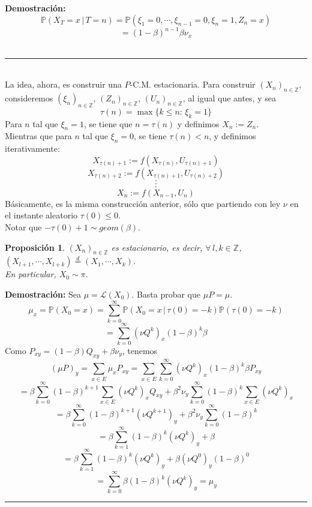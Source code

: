 \documentclass[a4paper]{article}
\newcommand{\prob}{\mathbb{P}}
\newtheorem{prop}{Proposici\'on}
\numberwithin{equation}{subsection}
\def\Z{\mathbb Z}
\begin{document}
\textbf{Demostración: }
\[\prob(X_T = x\,|\,T=n) = \prob(\xi_1 = 0,\cdots,\xi_{n-1}=0,\xi_n=1,Z_n=x)\]
\[ = (1-\beta)^{n-1}\beta \nu_x\]\\
\rule{0.7em}{0.7em}\\ \newline
La idea, ahora, es construir una $P$-C.M. estacionaria. Para construir $(X_n)_{n\in \Z}$, consideremos $(\xi_n)_{n\in \Z}$, $(Z_n)_{n\in \Z}$, $(U_n)_{n\in \Z}$, al igual que antes, y sea
\[\tau(n) = \max\{k\leq n:\,\xi_k=1\}\]
Para $n$ tal que  $\xi_n = 1$, se tiene que  $n=\tau(n)$ y definimos $X_n:=Z_n$.\\ Mientras que para $n$ tal que $\xi_n =0$, se tiene $\tau(n)<n$, y definimos iterativamente:
\[X_{\tau(n)+1}:= f(X_{\tau(n)},U_{\tau(n)+1})\]
\[X_{\tau(n)+2}:= f(X_{\tau(n)+1},U_{\tau(n)+2})\]
\[\cdot\]
\[\cdot\]
\[\cdot\]
\[X_n:= f(X_{n-1},U_n)\]
Básicamente, es la misma construcción  anterior, sólo que partiendo  con ley $\nu$ en el instante aleatorio $\tau(0)\leq 0$.\\ \newline
Notar que $-\tau(0)+1 \sim geom(\beta)$.
\begin{prop}
$(X_n)_{n\in \Z}$ es estacionario, es decir, $\forall\, l,k\in \Z$, $(X_{l+1},\cdots,X_{l+k}) \overset{\,d\,}{=}(X_1,\cdots,X_k)$.\\ En particular, $X_0\sim \pi$.
\end{prop}

\textbf{Demostración: }Sea $\mu = \mathcal{L}(X_0)$. Basta probar que $\mu P = \mu$.
\[\mu_x = \prob(X_0=x) = \sum_{k=0}^{\infty}\prob(X_0=x\,|\,\tau(0)=-k)\prob(\tau(0)=-k)\]
\[= \sum_{k=0}^{\infty}(\nu Q^k)_x (1-\beta)^{k}\beta\]
Como $P_{xy} = (1-\beta)Q_{xy} + \beta \nu_y$, tenemos
\[(\mu P)_y = \sum_{x\in E}\mu_x P_{xy} = \sum_{x\in E}\sum_{k=0}^{\infty}(\nu Q^k)_x(1-\beta)^k\beta P_{xy}\]
\[= \beta \sum_{k=0}^{\infty}(1-\beta)^{k+1}\sum_{x\in E}(\nu Q^k)_xQ_{xy} + \beta^2 \nu_y \sum_{k=0}^{\infty}(1-\beta)^k\sum_{x\in E}(\nu Q^k)_x\]
\[= \beta\sum_{k=0}^{\infty}(1-\beta)^{k+1}(\nu Q^{k+1})_y + \beta^2\nu_y\sum_{k=0}^{\infty}(1-\beta)^k\]
\[= \beta\sum_{k=1}^{\infty}(1-\beta)^{k}(\nu Q^{k})_y + \beta\]
\[= \beta\sum_{k=1}^{\infty}(1-\beta)^{k}(\nu Q^{k})_y + \beta(\nu Q^0)_y(1-\beta)^0\]
\[= \sum_{k=0}^{\infty}\beta(1-\beta)^{k}(\nu Q^{k})_y = \mu_y\]
\rule{0.7em}{0.7em}\\ \newline
\end{document}
